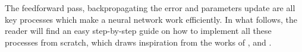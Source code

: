 The feedforward pass, backpropagating the error and parameters update are all key processes which make a neural network work efficiently. In what follows, the reader will find an easy step-by-step guide on how to implement all these processes from scratch, which draws inspiration from  the works of \cite{dima}, \cite{nielsen2015neural} and \cite{rashid2016make}.